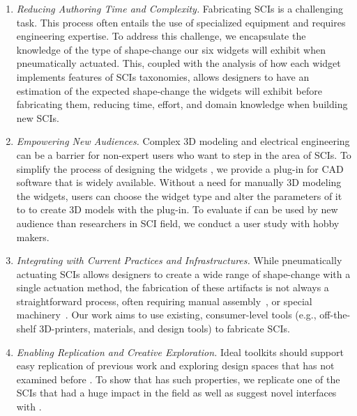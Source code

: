     \begin{enumerate}
      \item \textit{Reducing Authoring Time and Complexity.}
        Fabricating SCIs is a challenging task. This process often entails the
        use of specialized equipment and requires engineering expertise. To
        address this challenge, we encapsulate the knowledge of the type of
        shape-change our six widgets will exhibit when pneumatically actuated.
        This, coupled with the analysis of how each widget implements features
        of SCIs taxonomies, allows designers to have an estimation of the
        expected shape-change the widgets will exhibit before fabricating them,
        reducing time, effort, and domain knowledge when building new SCIs.
        
      \item \textit{Empowering New Audiences.}
        Complex 3D modeling and electrical engineering can be a barrier for
        non-expert users who want to step in the area of SCIs. To simplify the
        process of designing the widgets \cite{Olsen:2007ik}, we provide a
        plug-in for CAD software that is widely available. Without a need for
        manually 3D modeling the widgets, users can choose the widget type and
        alter the parameters of it to to create 3D models with the plug-in. To
        evaluate if \mp can be used by new audience than researchers in SCI
        field, we conduct a user study with hobby makers.
        
      \item \textit{Integrating with Current Practices and Infrastructures.}
        While pneumatically actuating SCIs allows designers to create a wide
        range of shape-change with a single actuation method, the fabrication of
        these artifacts is not always a straightforward process, often requiring
        manual assembly~\cite{Yao:2013bg}, or special
        machinery~\cite{10.1145/3025453.3025898, 10.1145/2984511.2984520}. Our
        work aims to use existing, consumer-level tools (e.g., off-the-shelf
        3D-printers, materials, and design tools) to fabricate SCIs.
        
      \item \textit{Enabling Replication and Creative Exploration.}
        Ideal toolkits should support easy replication of previous work
        \cite{Greenberg2007} and exploring design spaces that has not examined
        before \cite{Olsen:2007ik}. To show that \mp has such properties, we
        replicate one of the SCIs that had a huge impact in the field
        \cite{10.1145/2501988.2502032} as well as suggest novel interfaces with
        \mp.
    \end{enumerate}
          

